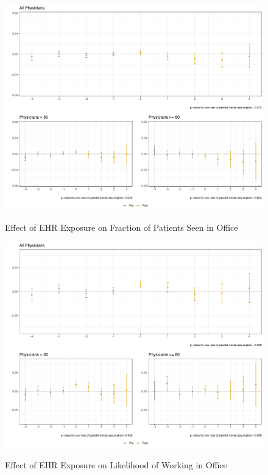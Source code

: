 \documentclass[11pt]{article}
\begin{document}
\begin{figure}[ht]
    \centering
    \caption{Effect of EHR Exposure on Fraction of Patients Seen in Office}
    \includegraphics[scale=.57]{Objects/officefrac_plot.pdf}
    \label{fig:officefirst}
\end{figure}

\begin{figure}[ht]
    \centering
    \caption{Effect of EHR Exposure on Likelihood of Working in Office}
    \includegraphics[scale=.57]{Objects/officeind_plot.pdf}
    \label{fig:officesecond}
\end{figure}
\end{document}
